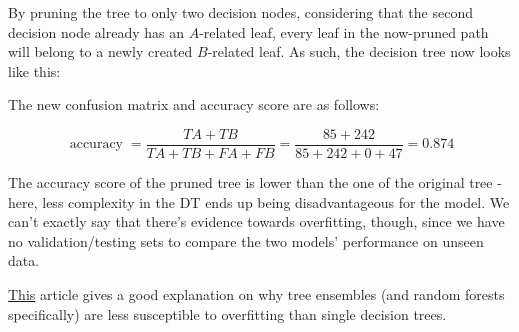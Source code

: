 \documentclass[12pt]{article}
\begin{document}
\begin{enumerate}[leftmargin=\labelsep]
        By pruning the tree to only two decision nodes, considering that the second
        decision node already has an $A$-related leaf, every leaf in the now-pruned
        path will belong to a newly created $B$-related leaf. As such, the decision tree
        now looks like this:

        \begin{figure}[H]
          \centering
          
        \end{figure}

        The new confusion matrix and accuracy score are as follows:

        \begin{figure}[H]
          \centering
          
        \end{figure}

        \begin{equation*}
          \operatorname{accuracy} = \frac{TA + TB}{TA + TB + FA + FB} = \frac{85 + 242}{85 + 242 + 0 + 47} = 0.874
        \end{equation*}

        The accuracy score of the pruned tree is lower than the one of the original
        tree - here, less complexity in the DT ends up being disadvantageous for the
        model. We can't exactly say that there's evidence towards overfitting, though,
        since we have no validation/testing sets to compare the two models' performance
        on unseen data.

        \href{https://towardsdatascience.com/basic-ensemble-learning-random-forest-adaboost-gradient-boosting-step-by-step-explained-95d49d1e2725}{This}
        article gives a good explanation on why tree ensembles (and random forests
        specifically) are less susceptible to overfitting than single decision trees.

\end{enumerate}
\end{document}
